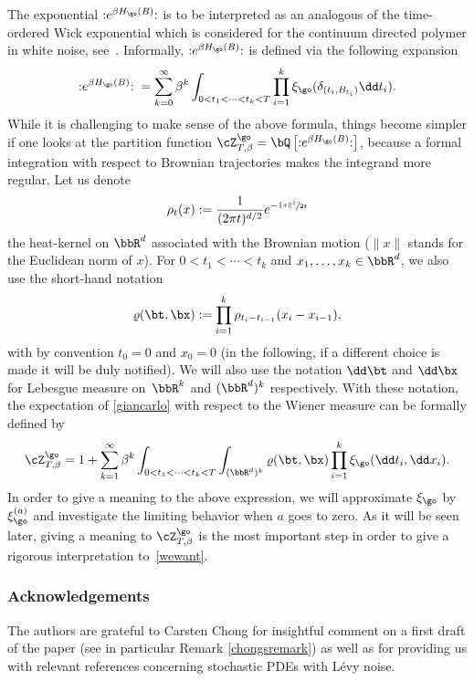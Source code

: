 The exponential $\mathbf{:}e^{\beta H_\go(B)}\mathbf{:}$ is to be interpreted as an analogous of the time-ordered Wick exponential which is considered for the continuum directed polymer in white noise, see~\cite{AKQ14b}.
Informally, $\mathbf{:}e^{\beta H_\go(B)}\mathbf{:} $ is defined via the following expansion
\begin{equation}\label{giancarlo}
\mathbf{:}e^{\beta H_\go(B)}\mathbf{:}\; = \sum_{k=0}^\infty \beta^k\int_{0<t_1<\dots<t_k<T} \prod_{i=1}^k\xi_{\go} (\delta_{(t_i, B_{t_i}) } \dd t_i).
\end{equation}
While it is challenging to make sense of the above formula, things become simpler if one looks at the partition function $\cZ^{\go}_{T,\beta}=\bQ\left[ \mathbf{:}e^{\beta H_\go(B)}\mathbf{:} \right]$, because
a formal integration with respect to Brownian trajectories makes the integrand more regular.
Let us denote%
\begin{equation}\label{defrhotx}
\rho_t(x):=\frac{1}{(2\pi t)^{d/2}}e^{-\sfrac{\|x\|^2}{2t}}
\end{equation}
the heat-kernel on $\bbR^d$ associated with the Brownian motion ($\|x\|$ stands for the Euclidean norm of $x$).
For $0<t_1<\cdots < t_k$ and $x_1, \ldots, x_k \in \bbR^d$, we also use the short-hand notation
\begin{equation}
\label{def:rho}
\varrho(\bt,\bx) := \prod_{i=1}^{k} \rho_{t_i-t_{i-1}} (x_i-x_{i-1}),
\end{equation}
with by convention $t_0=0$ and $x_0=0$
(in the following, if a different choice is made it will be duly notified).
We will also use the notation $\dd \bt$ and $\dd \bx$ for Lebesgue measure on~$\bbR^k$ and $(\bbR^d)^k$ respectively.
With these notation, the expectation of
\eqref{giancarlo} with respect to the Wiener measure can be formally defined by
\begin{equation}\label{lexpress}
\cZ^{\go}_{T,\beta}=1+\sum_{k=1}^\infty \beta^k\int_{0<t_1<\dots<t_k<T}\int_{(\bbR^d)^k} \varrho(\bt,\bx) \prod_{i=1}^k \xi_{\go} (\dd t_i, \dd x_i).
\end{equation}
In order to give a meaning to the above expression, we will approximate $\xi_{\go}$ by $\xi_{\go}^{(a)}$ and investigate the limiting behavior when $a$ goes to zero.
As it will be seen later, giving a meaning to $\cZ^{\go}_{T,\beta}$ is the most important step in order to give a rigorous interpretation to~\eqref{wewant}.

\subsubsection*{Acknowledgements}
The authors are grateful to Carsten Chong for insightful comment on a first draft of the paper (see in particular Remark \ref{chongsremark}) as well as for providing us with relevant references concerning stochastic PDEs with Lévy noise.


